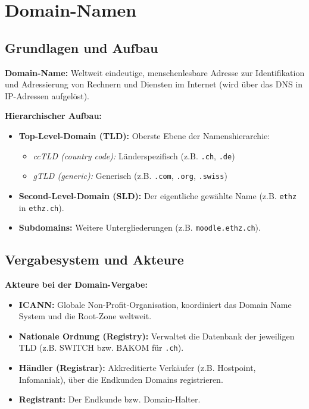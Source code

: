 \section{Domain-Namen}

\subsection{Grundlagen und Aufbau}

\begin{definition}
    \textbf{Domain-Name:} Weltweit eindeutige, menschenlesbare Adresse zur Identifikation und Adressierung von Rechnern und Diensten im Internet (wird über das DNS in IP-Adressen aufgelöst).
\end{definition}

\begin{remark}
    \textbf{Hierarchischer Aufbau:}
    \begin{itemize}
        \item \textbf{Top-Level-Domain (TLD):} Oberste Ebene der Namenshierarchie:
              \begin{itemize}
                  \item \textit{ccTLD (country code):} Länderspezifisch (z.B. \texttt{.ch}, \texttt{.de})
                  \item \textit{gTLD (generic):} Generisch (z.B. \texttt{.com}, \texttt{.org}, \texttt{.swiss})
              \end{itemize}
        \item \textbf{Second-Level-Domain (SLD):} Der eigentliche gewählte Name (z.B. \texttt{ethz} in \texttt{ethz.ch}).
        \item \textbf{Subdomains:} Weitere Untergliederungen (z.B. \texttt{moodle.ethz.ch}).
    \end{itemize}
\end{remark}

\subsection{Vergabesystem und Akteure}

\begin{remark}
    \textbf{Akteure bei der Domain-Vergabe:}
    \begin{itemize}
        \item \textbf{ICANN:} Globale Non-Profit-Organisation, koordiniert das Domain Name System und die Root-Zone weltweit.
        \item \textbf{Nationale Ordnung (Registry):} Verwaltet die Datenbank der jeweiligen TLD (z.B. SWITCH bzw. BAKOM für \texttt{.ch}).
        \item \textbf{Händler (Registrar):} Akkreditierte Verkäufer (z.B. Hostpoint, Infomaniak), über die Endkunden Domains registrieren.
        \item \textbf{Registrant:} Der Endkunde bzw. Domain-Halter.
    \end{itemize}
\end{remark}

